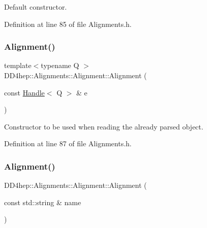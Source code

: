 Default constructor. 



Definition at line 85 of file Alignments.\+h.

\hypertarget{class_d_d4hep_1_1_alignments_1_1_alignment_a8f184f568b2b423780115e41ea514558}{}\label{class_d_d4hep_1_1_alignments_1_1_alignment_a8f184f568b2b423780115e41ea514558} 
\subsubsection{\texorpdfstring{Alignment()}{Alignment()}\hspace{0.1cm}{\footnotesize\ttfamily [3/4]}}
{\footnotesize\ttfamily template$<$typename Q $>$ \\
D\+D4hep\+::\+Alignments\+::\+Alignment\+::\+Alignment (\begin{DoxyParamCaption}\item[{const \hyperlink{class_d_d4hep_1_1_handle}{Handle}$<$ Q $>$ \&}]{e }\end{DoxyParamCaption})\hspace{0.3cm}{\ttfamily [inline]}}



Constructor to be used when reading the already parsed object. 



Definition at line 87 of file Alignments.\+h.

\hypertarget{class_d_d4hep_1_1_alignments_1_1_alignment_afe496862cf06bb5ba006b6c20362e2b1}{}\label{class_d_d4hep_1_1_alignments_1_1_alignment_afe496862cf06bb5ba006b6c20362e2b1} 
\subsubsection{\texorpdfstring{Alignment()}{Alignment()}\hspace{0.1cm}{\footnotesize\ttfamily [4/4]}}
{\footnotesize\ttfamily D\+D4hep\+::\+Alignments\+::\+Alignment\+::\+Alignment (\begin{DoxyParamCaption}\item[{const std\+::string \&}]{name }\end{DoxyParamCaption})}



